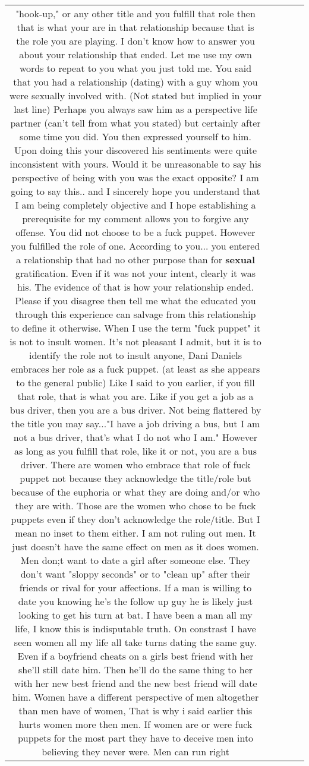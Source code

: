 \documentclass[11pt]{article}
\newlength\mylength
\begin{document}
\begin{center}
\begin{longtable}{|C{.65\mylength}|C{.30\mylength}|C{.12\mylength}|C{.12\mylength}|C{.12\mylength}|}
"hook-up," or any other title and you fulfill that role then that is what your are in that relationship because that is the role you are playing. I don't know how to answer you about your relationship that ended. Let me use my own words to repeat to you what you just told me. You said that you had a relationship (dating) with a guy whom you were sexually involved with. (Not stated but implied in your last line) Perhaps you always saw him as a perspective life partner (can't tell from what you stated) but certainly after some time you did. You then expressed yourself to him. Upon doing this your discovered his sentiments were quite inconsistent with yours. Would it be unreasonable to say his perspective of being with you was the exact opposite? I am going to say this.. and I sincerely hope you understand that I am being completely objective and I hope establishing a prerequisite for my comment allows you to forgive any offense. You did not choose to be a fuck puppet. However you fulfilled the role of one. According to you... you entered a relationship that had no other purpose than for \textbf{sexual} gratification. Even if it was not your intent, clearly it was his. The evidence of that is how your relationship ended. Please if you disagree then tell me what the educated you through this experience can salvage from this relationship to define it otherwise. When I use the term "fuck puppet" it is not to insult women. It's not pleasant I admit, but it is to identify the role not to insult anyone, Dani Daniels embraces her role as a fuck puppet. (at least as she appears to the general public)  Like I said to you earlier, if you fill that role, that is what you are. Like if you get a job as a bus driver, then you are a bus driver. Not being flattered by the title you may say..."I have a job driving a bus, but I am not a bus driver, that's what I do not who I am." However as long as you fulfill that role, like it or not, you are a bus driver. There are women who embrace that role of fuck puppet not because they acknowledge the title/role but because of the euphoria or what they are doing and/or who they are with. Those are the women who chose to be fuck puppets even if they don't acknowledge the role/title. But I mean no inset to them either. I am not ruling out men. It just doesn't have the same effect on men as it does women. Men don;t want to date a girl after someone else. They don't want "sloppy seconds" or to "clean up" after their friends or rival for your affections. If a man is willing to date you knowing he's the follow up guy he is likely just looking to get his turn at bat. I have been a man all my life, I know this is indisputable truth. On constrast I have seen women all my life all take turns dating the same guy. Even if a boyfriend cheats on a girls best friend with her she'll still date him. Then he'll do the same thing to her with her new best friend and the new best friend will date him. Women have a different perspective of men altogether than men have of women, That is why i said earlier this hurts women more then men. If women are or were fuck puppets for the most part they have to deceive men into believing they never were. Men can run right 
\end{longtable}
\end{center}
\end{document}
